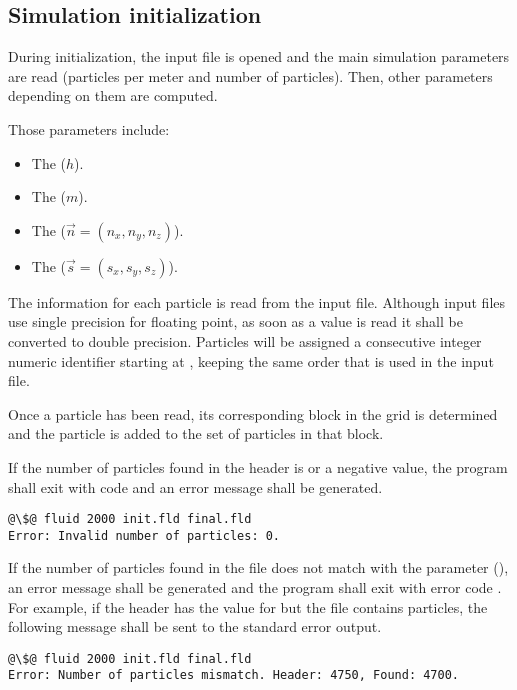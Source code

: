 \subsection{Simulation initialization}

During initialization, the input file is opened and the main simulation
parameters are read (particles per meter and number of particles).
Then, other parameters depending on them are computed.

Those parameters include:
\begin{itemize}
\item The  ($h$).
\item The  ($m$).
\item The  ($\vec{n} = (n_x, n_y, n_z)$).
\item The  ($\vec{s} = (s_x, s_y, s_z)$).
\end{itemize}

The information for each particle is read from the input file. Although input
files use single precision for floating point, as soon as a value is read it
shall be converted to double precision.  Particles will be assigned a consecutive
integer numeric identifier starting at , keeping the same order that
is used in the input file.

Once a particle has been read, its corresponding block in the grid is determined
and the particle is added to the set of particles in that block. 

If the number of particles found in the header is  or a negative value, 
the program shall exit with code  and an error message shall be 
generated.

\begin{lstlisting}[style=terminal,escapechar=@]
@\$@ fluid 2000 init.fld final.fld
Error: Invalid number of particles: 0.
\end{lstlisting}

If the number of particles found in the file does not match with the parameter
 (), an error message shall be generated
and the program shall exit with error code . For example, if the 
header has the value  for  but the file contains 
 particles, the following message shall be sent to the standard
error output.

\begin{lstlisting}[style=terminal,escapechar=@]
@\$@ fluid 2000 init.fld final.fld
Error: Number of particles mismatch. Header: 4750, Found: 4700.
\end{lstlisting}

